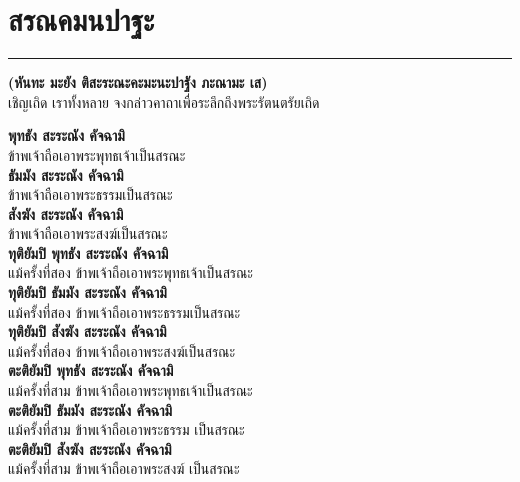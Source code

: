 \documentclass[12pt]{article}
\begin{document}
\section{สรณคมนปาฐะ}
\hrule
\begin{center}
\textbf{(หันทะ มะยัง ติสะระณะคะมะนะปาฐัง ภะณามะ เส)}\\
เชิญเถิด เราทั้งหลาย จงกล่าวคาถาเพื่อระลึกถึงพระรัตนตรัยเถิด
\end{center}
\textbf{พุทธัง สะระณัง คัจฉามิ}\\
\indent ข้าพเจ้าถือเอาพระพุทธเจ้าเป็นสรณะ\\
\textbf{ธัมมัง สะระณัง คัจฉามิ}\\
\indent ข้าพเจ้าถือเอาพระธรรมเป็นสรณะ\\
\textbf{สังฆัง สะระณัง คัจฉามิ}\\
\indent ข้าพเจ้าถือเอาพระสงฆ์เป็นสรณะ\\
\textbf{ทุติยัมปิ พุทธัง สะระณัง คัจฉามิ}\\
\indent แม้ครั้งที่สอง ข้าพเจ้าถือเอาพระพุทธเจ้าเป็นสรณะ\\
\textbf{ทุติยัมปิ ธัมมัง สะระณัง คัจฉามิ}\\
\indent แม้ครั้งที่สอง ข้าพเจ้าถือเอาพระธรรมเป็นสรณะ\\
\textbf{ทุติยัมปิ สังฆัง สะระณัง คัจฉามิ}\\
\indent แม้ครั้งที่สอง ข้าพเจ้าถือเอาพระสงฆ์เป็นสรณะ\\
\textbf{ตะติยัมปิ พุทธัง สะระณัง คัจฉามิ}\\
\indent แม้ครั้งที่สาม ข้าพเจ้าถือเอาพระพุทธเจ้าเป็นสรณะ\\
\textbf{ตะติยัมปิ ธัมมัง สะระณัง คัจฉามิ}\\
\indent แม้ครั้งที่สาม ข้าพเจ้าถือเอาพระธรรม เป็นสรณะ\\
\textbf{ตะติยัมปิ สังฆัง สะระณัง คัจฉามิ}\\
\indent แม้ครั้งที่สาม ข้าพเจ้าถือเอาพระสงฆ์ เป็นสรณะ\\

\pagebreak
\end{document}
